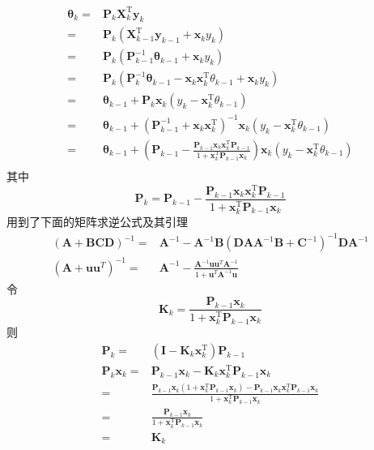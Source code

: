 \begin{align*}
\boldsymbol{\theta}_k =& \mathbf{P}_k\mathbf{X}_k^\mathrm{T}\boldsymbol{y}_k \\
=& \mathbf{P}_k(\mathbf{X}_{k-1}^\mathrm{T}\boldsymbol{y}_{k-1}
 +\boldsymbol{x}_ky_k) \\
=& \mathbf{P}_k(\mathbf{P}_{k-1}^{-1}\boldsymbol{\theta}_{k-1}
 +\boldsymbol{x}_ky_k) \\
=& \mathbf{P}_k(\mathbf{P}_k^{-1}\boldsymbol{\theta}_{k-1}
 -\boldsymbol{x}_k\boldsymbol{x}_k^\mathrm{T}\theta_{k-1}+\boldsymbol{x}_ky_k) \\
=& \boldsymbol{\theta}_{k-1} + \mathbf{P}_k\boldsymbol{x}_k
 (y_k-\boldsymbol{x}_k^\mathrm{T}\theta_{k-1}) \\
=& \boldsymbol{\theta}_{k-1}
 +(\mathbf{P}_{k-1}^{-1} + \boldsymbol{x}_k\boldsymbol{x}_k^\mathrm{T})^{-1}
 \boldsymbol{x}_k(y_k-\boldsymbol{x}_k^\mathrm{T}\theta_{k-1}) \\
=& \boldsymbol{\theta}_{k-1}
 +(\mathbf{P}_{k-1}-\frac{\mathbf{P}_{k-1}\boldsymbol{x}_k\boldsymbol{x}_k^\mathrm{T}
 \mathbf{P}_{k-1}}{1+\boldsymbol{x}_k^\mathrm{T}\mathbf{P}_{k-1}\boldsymbol{x}_k})
 \boldsymbol{x}_k(y_k-\boldsymbol{x}_k^\mathrm{T}\theta_{k-1}) \\
\end{align*}
其中
\begin{equation*}
    \mathbf{P}_k =
 \mathbf{P}_{k-1}-\frac{\mathbf{P}_{k-1}\boldsymbol{x}_k\boldsymbol{x}_k^\mathrm{T}
 \mathbf{P}_{k-1}}{1+\boldsymbol{x}_k^\mathrm{T}\mathbf{P}_{k-1}\boldsymbol{x}_k}
\end{equation*}
用到了下面的矩阵求逆公式及其引理
\begin{align*}
(\mathbf{A}+\mathbf{B C D})^{-1} =& \mathbf{A}^{-1}-\mathbf{A}^{-1} \mathbf{B}
(\mathbf{D A} \mathbf{A}^{-1} \mathbf{B}+\mathbf{C}^{-1})^{-1} \mathbf{D A}^{-1} \\
(\mathbf{A}+\mathbf{u} \mathbf{u}^{T})^{-1} =& \mathbf{A}^{-1}
 -\frac{\mathbf{A}^{-1} \mathbf{u} \mathbf{u}^{T} \mathbf{A}^{-1}}
 {1+\mathbf{u}^{T} \mathbf{A}^{-1} \mathbf{u}}
\end{align*}
令
\begin{equation*}
    \mathbf{K}_k = \frac{\mathbf{P}_{k-1}\boldsymbol{x}_k}
{1+\boldsymbol{x}_k^\mathrm{T}\mathbf{P}_{k-1}\boldsymbol{x}_k}
\end{equation*}
则
\begin{align*}
\mathbf{P}_k =& (\mathbf{I}-\mathbf{K}_k\boldsymbol{x}_k^\mathrm{T})\mathbf{P}_{k-1}\\
\mathbf{P}_k\boldsymbol{x}_k =& \mathbf{P}_{k-1}\boldsymbol{x}_k
 -\mathbf{K}_k\boldsymbol{x}_k^\mathrm{T}\mathbf{P}_{k-1}\boldsymbol{x}_k \\
=& \frac{\mathbf{P}_{k-1}\boldsymbol{x}_k
 (1+\boldsymbol{x}_k^\mathrm{T}\mathbf{P}_{k-1}\boldsymbol{x}_k)
 -\mathbf{P}_{k-1}\boldsymbol{x}_k\boldsymbol{x}_k^\mathrm{T}
 \mathbf{P}_{k-1}\boldsymbol{x}_k}
 {1+\boldsymbol{x}_k^\mathrm{T}\mathbf{P}_{k-1}\boldsymbol{x}_k} \\
=& \frac{\mathbf{P}_{k-1}\boldsymbol{x}_k}
 {1+\boldsymbol{x}_k^\mathrm{T}\mathbf{P}_{k-1}\boldsymbol{x}_k} \\
=& \mathbf{K}_k \\
\end{align*}

